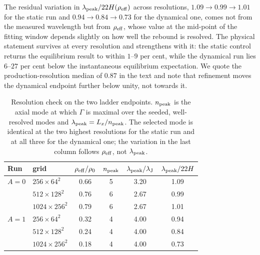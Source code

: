 \documentclass[usenatbib,twoside,twocolumn]{mnras}
\begin{document}
The residual variation in $\lambda_{\rm peak}/22H(\rho_{\rm eff})$ across resolutions, $1.09\to0.99\to1.01$ for the static run and $0.94\to0.84\to0.73$ for the dynamical one, comes not from the measured wavelength but from $\rho_{\rm eff}$, whose value at the mid-point of the fitting window depends slightly on how well the rebound is resolved. The physical statement survives at every resolution and strengthens with it: the static control returns the equilibrium result to within $1$--$9$ per cent, while the dynamical run lies $6$--$27$ per cent below the instantaneous equilibrium expectation. We quote the production-resolution median of $0.87$ in the text and note that refinement moves the dynamical endpoint further below unity, not towards it.

\begin{table}
\caption{Resolution check on the two ladder endpoints. $n_{\rm peak}$ is the axial mode at which $\Gamma$ is maximal over the seeded, well-resolved modes and $\lambda_{\rm peak}=L_x/n_{\rm peak}$. The selected mode is identical at the two highest resolutions for the static run and at all three for the dynamical one; the variation in the last column follows $\rho_{\rm eff}$, not $\lambda_{\rm peak}$.}
\label{tab:xlconv}
\footnotesize
\setlength{\tabcolsep}{4pt}
\begin{tabular}{llcccc}
\toprule
Run & grid & $\rho_{\rm eff}/\rho_0$ & $n_{\rm peak}$ & $\lambda_{\rm peak}/\lambda_{\rm J}$ & $\lambda_{\rm peak}/22H$ \\
\midrule
$A=0$ & $256\times64^2$   & 0.66 & 5 & 3.20 & 1.09 \\
      & $512\times128^2$  & 0.76 & 6 & 2.67 & 0.99 \\
      & $1024\times256^2$ & 0.79 & 6 & 2.67 & 1.01 \\
\midrule
$A=1$ & $256\times64^2$   & 0.32 & 4 & 4.00 & 0.94 \\
      & $512\times128^2$  & 0.24 & 4 & 4.00 & 0.84 \\
      & $1024\times256^2$ & 0.18 & 4 & 4.00 & 0.73 \\
\bottomrule
\end{tabular}
\end{table}
\end{document}
